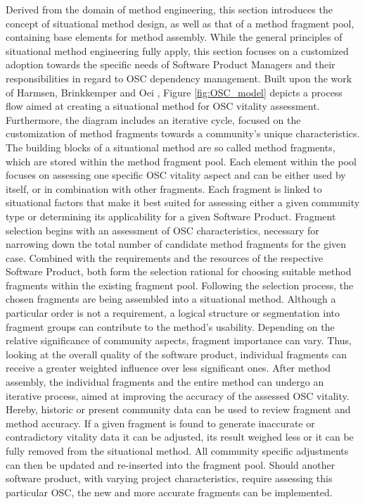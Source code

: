 \documentclass[final,5p,times,twocolumn]{elsarticle}
\begin{document}
Derived from the domain of method engineering, this section introduces the concept of situational method design, as well as that of a method fragment pool, containing base elements for method assembly. While the general principles of situational method engineering \cite{VanDeWeerd2008} fully apply, this section focuses on a customized adoption towards the specific needs of Software Product Managers and their responsibilities in regard to OSC dependency management. Built upon the work of Harmsen, Brinkkemper and Oei \cite{Harmsen1994}, Figure \ref{fig:OSC_model} depicts a process flow aimed at creating a situational method for OSC vitality assessment. Furthermore, the diagram includes an iterative cycle, focused on the customization of method fragments towards a community's unique characteristics. The building blocks of a situational method are so called method fragments, which are stored within the method fragment pool. Each element within the pool focuses on assessing one specific OSC vitality aspect and can be either used by itself, or in combination with other fragments. Each fragment is linked to situational factors that make it best suited for assessing either a given community type or determining its applicability for a given Software Product. Fragment selection begins with an assessment of OSC characteristics, necessary for narrowing down the total number of candidate method fragments for the given case. Combined with the requirements and the resources of the respective Software Product, both form the selection rational for choosing suitable method fragments within the existing fragment pool. Following the selection process, the chosen fragments are being assembled into a situational method. Although a particular order is not a requirement, a logical structure or segmentation into fragment groups can contribute to the method’s usability. Depending on the relative significance of community aspects, fragment importance can vary. Thus, looking at the overall quality of the software product, individual fragments can receive a greater weighted influence over less significant ones. After method assembly, the individual fragments and the entire method can undergo an iterative process, aimed at improving the accuracy of the assessed OSC vitality. Hereby, historic or present community data can be used to review fragment and method accuracy. If a given fragment is found to generate inaccurate or contradictory vitality data it can be adjusted, its result weighed less or it can be fully removed from the situational method. All community specific adjustments can then be updated and re-­inserted into the fragment pool. Should another software product, with varying project characteristics, require assessing this particular OSC, the new and more accurate fragments can be implemented.
\end{document}
